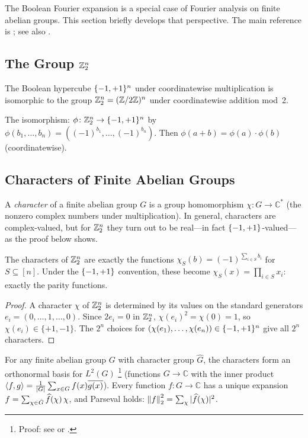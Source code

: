 The Boolean Fourier expansion is a special case of Fourier analysis on
finite abelian groups. This section briefly develops that perspective.
The main reference is \citet{terras1999fourier}; see also
\citet{diaconis1988group}.

\subsection{The Group $\mathbb{Z}_2^n$}\label{sec:z2n}

The Boolean hypercube $\{-1,+1\}^n$ under coordinatewise multiplication is
isomorphic to the group $\mathbb{Z}_2^n = (\mathbb{Z}/2\mathbb{Z})^n$ under coordinatewise
addition mod~2.

The isomorphism: $\phi \colon \mathbb{Z}_2^n \to \{-1,+1\}^n$ by
$\phi(b_1, \ldots, b_n) = ((-1)^{b_1}, \ldots, (-1)^{b_n})$.
Then $\phi(a + b) = \phi(a) \cdot \phi(b)$ (coordinatewise).

\subsection{Characters of Finite Abelian Groups}\label{sec:characters}

\begin{definition}[Character]\label{def:character}
A \emph{character} of a finite abelian group $G$ is a group homomorphism
$\chi \colon G \to \mathbb{C}^*$ (the nonzero complex numbers under
multiplication). In general, characters are complex-valued, but for
$\mathbb{Z}_2^n$ they turn out to be real---in fact $\{-1,+1\}$-valued---as the
proof below shows.
\end{definition}

\begin{theorem}\label{thm:characters-z2n}
The characters of $\mathbb{Z}_2^n$ are exactly the functions
$\chi_S(b) = (-1)^{\sum_{i \in S} b_i}$ for $S \subseteq [n]$.
Under the $\{-1,+1\}$ convention, these become $\chi_S(x) = \prod_{i \in S} x_i$:
exactly the parity functions.
\end{theorem}

\begin{proof}
A character $\chi$ of $\mathbb{Z}_2^n$ is determined by its values on the
standard generators $e_i = (0, \ldots, 1, \ldots, 0)$. Since
$2 e_i = 0$ in $\mathbb{Z}_2^n$, $\chi(e_i)^2 = \chi(0) = 1$, so
$\chi(e_i) \in \{+1, -1\}$. The $2^n$ choices for
$(\chi(e_1), \ldots, \chi(e_n)) \in \{-1,+1\}^n$ give all $2^n$ characters.
\end{proof}

\begin{theorem}\label{thm:fourier-group}
For any finite abelian group $G$ with character group $\hat{G}$, the
characters form an orthonormal basis for $L^2(G)$%
\footnote{Proof: see \citet[Chapters~1--2]{terras1999fourier} or
\citet[Chapter~1]{diaconis1988group}.}
(functions $G \to \mathbb{C}$
with the inner product $\langle f, g \rangle = \frac{1}{|G|}\sum_{x \in G} f(x)\overline{g(x)}$).
Every function $f \colon G \to \mathbb{C}$ has a unique expansion
$f = \sum_{\chi \in \hat{G}} \widehat{f}(\chi)\, \chi$, and Parseval holds:
$\left\| f \right\|_2^2 = \sum_\chi |\widehat{f}(\chi)|^2$.
\end{theorem}


